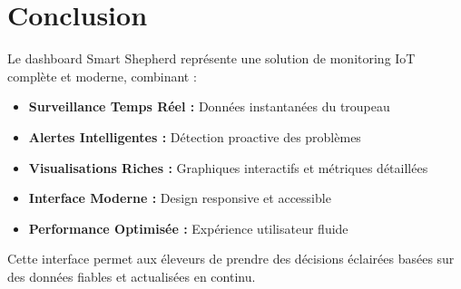 \documentclass[a4paper,12pt]{article}
\begin{document}
\section{Conclusion}

Le dashboard Smart Shepherd représente une solution de monitoring IoT complète et moderne, combinant :
\begin{itemize}
    \item \textbf{Surveillance Temps Réel :} Données instantanées du troupeau
    \item \textbf{Alertes Intelligentes :} Détection proactive des problèmes
    \item \textbf{Visualisations Riches :} Graphiques interactifs et métriques détaillées
    \item \textbf{Interface Moderne :} Design responsive et accessible
    \item \textbf{Performance Optimisée :} Expérience utilisateur fluide
\end{itemize}

Cette interface permet aux éleveurs de prendre des décisions éclairées basées sur des données fiables et actualisées en continu.
\end{document}
